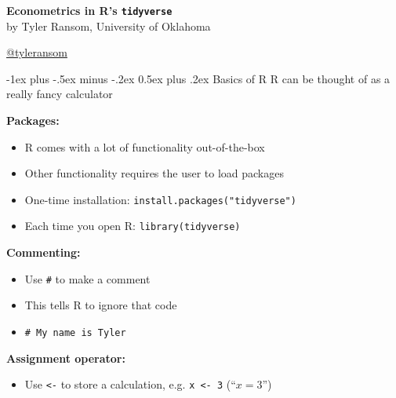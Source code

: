 \documentclass[10pt,landscape]{article}
\makeatletter
\renewcommand{\section}{\@startsection{section}{1}{0mm}%
                                {-1ex plus -.5ex minus -.2ex}%
                                {0.5ex plus .2ex}%
                                {\normalfont\large\bfseries}}
\makeatother
\begin{document}
\raggedright
\footnotesize
\begin{multicols}{3}


\setlength{\premulticols}{1pt}
\setlength{\postmulticols}{1pt}
\setlength{\multicolsep}{1pt}
\setlength{\columnsep}{2pt}

\begin{center}
     {\Large{\textbf{Econometrics in R's \texttt{tidyverse}}}} \\
     
     {\footnotesize by Tyler Ransom, University of Oklahoma}
     
     {\footnotesize \href{https://www.twitter.com/tyleransom}{\makeatletter @tyleransom \makeatother}}
\end{center}

\section{Basics of R}
R can be thought of as a really fancy calculator

\smallskip{}

\textbf{Packages:}\\
\begin{itemize}
    \item R comes with a lot of functionality out-of-the-box
    \item Other functionality requires the user to load packages
    \item One-time installation: \verb!install.packages("tidyverse")!
    \item Each time you open R: \verb!library(tidyverse)!
\end{itemize}

\smallskip{}

\textbf{Commenting:}\\
\begin{itemize}
    \item Use \verb!#! to make a comment
    \item This tells R to ignore that code
    \item[] \verb!# My name is Tyler!
\end{itemize}

\smallskip{}

\textbf{Assignment operator:}\\
\begin{itemize}
    \item Use \verb!<-! to store a calculation, e.g. \verb!x <- 3! (``$x=3$'')
\end{itemize}


\end{multicols}
\end{document}
